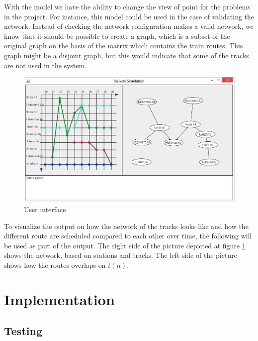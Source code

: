 \documentclass[10pt,a4paper]{article}
\begin{document}
With the model we have the ability to change the view of point for the problems in the project.
For instance, this model could be used in the case of validating the network. Instead of checking the network configuration makes a valid network, we know that it should be possible to create a graph, which is a subset of the original graph on the basis of the matrix which contains the train routes. This graph might be
a disjoint graph, but this would indicate that some of the tracks are not used in the system.
\begin{figure}[h]
\centering
\includegraphics[scale=0.6]{fig/user_interface.png}
 \caption{User interface}
 \label{fig:user_interface}
\end{figure}

To visualize the output on how the network of the tracks looks like and how the different route are scheduled compared to each other over time, the following will be used as part of the output. 
The right side of the picture depicted at figure \ref{fig:user_interface} shows the network, based on stations and tracks. The left side of the picture shows how the routes overlaps on $t\left(n\right)$.


\section{Implementation}
\subsection{Testing}
\end{document}
